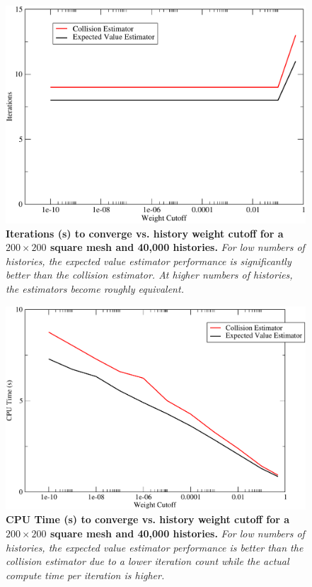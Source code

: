 \begin{figure}[t!]
  \centering
  \includegraphics[width=4.75in,clip]{chapters/mc_background/estimator_wc_iters.pdf}
  \caption{\textbf{Iterations (s) to converge vs. history weight
      cutoff for a $200 \times 200$ square mesh and 40,000 histories.}
    \textit{For low numbers of histories, the expected value estimator
      performance is significantly better than the collision
      estimator. At higher numbers of histories, the estimators become
      roughly equivalent.}}
  \label{fig:estimator_wc_iters}
\end{figure}

\begin{figure}[t!]
  \centering
  \includegraphics[width=4.75in,clip]{chapters/mc_background/estimator_wc_time.pdf}
  \caption{\textbf{CPU Time (s) to converge vs. history weight cutoff
      for a $200 \times 200$ square mesh and 40,000 histories.}
    \textit{For low numbers of histories, the expected value estimator
      performance is better than the collision estimator due to a
      lower iteration count while the actual compute time per
      iteration is higher.}}
  \label{fig:estimator_wc_time}
\end{figure}

